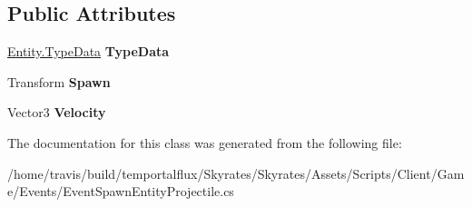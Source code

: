 \subsection*{Public Attributes}
\begin{DoxyCompactItemize}
\item 
\hypertarget{class_skyrates_1_1_client_1_1_game_1_1_event_1_1_event_spawn_entity_projectile_a388edb98762f18bebad06af2c5ab09bf}{\hyperlink{class_skyrates_1_1_common_1_1_entity_1_1_entity_1_1_type_data}{Entity.\-Type\-Data} {\bfseries Type\-Data}}\label{class_skyrates_1_1_client_1_1_game_1_1_event_1_1_event_spawn_entity_projectile_a388edb98762f18bebad06af2c5ab09bf}

\item 
\hypertarget{class_skyrates_1_1_client_1_1_game_1_1_event_1_1_event_spawn_entity_projectile_a9e08d311140edf6156e30bcb65c3d257}{Transform {\bfseries Spawn}}\label{class_skyrates_1_1_client_1_1_game_1_1_event_1_1_event_spawn_entity_projectile_a9e08d311140edf6156e30bcb65c3d257}

\item 
\hypertarget{class_skyrates_1_1_client_1_1_game_1_1_event_1_1_event_spawn_entity_projectile_a585b4f98f506b65fca022f40d8187c1e}{Vector3 {\bfseries Velocity}}\label{class_skyrates_1_1_client_1_1_game_1_1_event_1_1_event_spawn_entity_projectile_a585b4f98f506b65fca022f40d8187c1e}

\end{DoxyCompactItemize}


The documentation for this class was generated from the following file\-:\begin{DoxyCompactItemize}
\item 
/home/travis/build/temportalflux/\-Skyrates/\-Skyrates/\-Assets/\-Scripts/\-Client/\-Game/\-Events/Event\-Spawn\-Entity\-Projectile.\-cs\end{DoxyCompactItemize}

